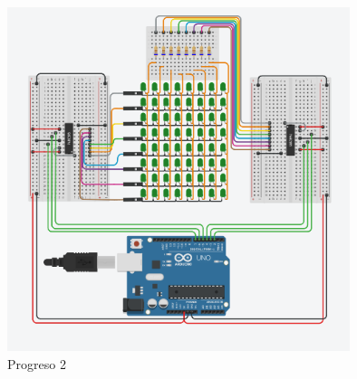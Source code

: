 \documentclass{article}
\begin{document}
\begin{figure}[h]
\includegraphics[width=10cm]{2.png}
\centering
\caption{Progreso 2}
\label{fig:primeros pasos}
\end{figure}
\end{document}
